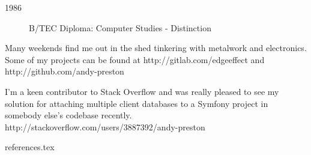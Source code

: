 
\begin{description}
    \item[1986] B/TEC Diploma: Computer Studies - Distinction
\end{description}


Many weekends find me out in the shed tinkering with metalwork and electronics.
Some of my projects can be found at
http://gitlab.com/edgeeffect
and
http://github.com/andy-preston

I'm a keen contributor to Stack Overflow and was really pleased to
see my solution for attaching multiple client databases to a Symfony
project in somebody else's codebase recently.
http://stackoverflow.com/users/3887392/andy-preston


 {references.tex}
